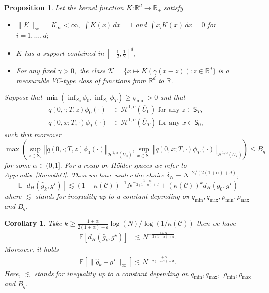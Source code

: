 \documentclass[a4paper,11pt]{amsart}
\theoremstyle{plain}
\newtheorem{proposition}[theorem]{Proposition}
\newtheorem{cor}[theorem]{Corollary}
\theoremstyle{remark}
\newcommand{\db}[1]{\todo[inline]{Denis: #1}}
\begin{document}
\begin{proposition}
\label{prop:conv-main} 
Let the kernel function $K:\mathbb{R}^{d}\to
\mathbb{R}_{+}$ satisfy

\begin{itemize}
\item $\|K\|_{\infty}=K_{\infty}<\infty,$ $\int K(x)\,dx=1$ and $\int
x_{i}K(x)\,dx=0$ for $i=1,\ldots,d;$

\item $K$ has a support contained in $\left[ -\frac{1}{2},\frac{1}{2}\right]
^{d}$;

\item For any fixed $\gamma>0,$ the class $\mathcal{K}=\{x\mapsto
K(\gamma(x-z)):z\in\mathbb{R}^{d}\}$ is a measurable VC-type class of
functions from $\mathbb{R}^{d}$ to $\mathbb{R}$.
\end{itemize}

Suppose that $\min\left(  \inf_{S_{0}}\phi_{0},\inf_{S_{T}}\phi_{T}\right)
\geq\phi_{\min}>0$ and that
\begin{align*}
q(0,\cdot;T,z)\phi_{0}(\cdot)  & \in\mathcal{H}^{1,\alpha}(\overline{U}%
_{0})\text{ \ for any }z\in\mathsf{S}_{T},\text{\ }\\
q(0,x;T,\cdot)\phi_{T}(\cdot)  & \in\mathcal{H}^{1,\alpha}(\overline{U}%
_{T})\text{ \ for any }x\in\mathsf{S}_{0},
\end{align*}
such that moreover%
\[
\max\left(  \sup_{z\in\mathsf{S}_{T}}\left\Vert q(0,\cdot;T,z)\phi_{0}%
(\cdot)\right\Vert _{\mathcal{H}^{1,\alpha}(\overline{U}_{0})},\sup
_{x\in\mathsf{S}_{0}}\left\Vert q(0,x;T,\cdot)\phi_{T}(\cdot)\right\Vert
_{\mathcal{H}^{1,\alpha}(\overline{U}_{T})}\right)  \leq B_{q}%
\]
for some $\alpha\in(0,1].$ For a recap on H\"older spaces we refer to Appendix~\ref{SmoothC}. Then we have under the choice $\delta
_{N}=N^{-2/(2(1+\alpha)+d)}$,
\[
\mathbb{E}\left[  d_{H}(\widehat{g}_{k},g^{\star})\right]  \lesssim
(1-\kappa(\mathcal{C}))^{-1}N^{-\frac{1+\alpha}{2(1+\alpha)+d}}+(\kappa
(\mathcal{C}))^{k}d_{H}(g_{0},g^{\star})
\]
where $\lesssim$ stands for inequality up to a constant depending on $q_{\min
},q_{\max},\rho_{\min},\rho_{\max}$ and $B_{q}.$


\end{proposition}


\begin{cor} \label{cor:rate} Take 
\(k\geq \frac{1+\alpha}{2(1+\alpha)+d}\log (N)/\log(1/\kappa(\mathcal{C}))\) then we have 
\begin{align*}
\mathbb{E}\left[  d_{H}(\widehat{g}_{k},g^{\star})\right]   &    \lesssim N^{-\frac{1+\alpha}{2(1+\alpha)+d}}.
\end{align*}
Moreover, it holds 
\begin{eqnarray}
\label{eq:rate}
\mathbb{E}\left[\|\widehat{g}_{k}-g^{\star}\|_\infty\right]\lesssim N^{-\frac{1+\alpha}{2(1+\alpha)+d}}.
\end{eqnarray}
Here, \(\lesssim\) stands for inequality up to a constant depending on \(q_{\min},q_{\max},\)  \(\rho_{\min},\rho_{\max}\) and \(B_q.\)
\end{cor}
\end{document}
